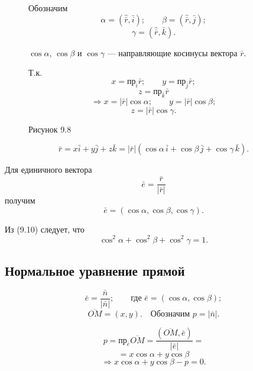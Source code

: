 \documentclass[12pt,a4paper]{article}
\newcommand{\vn}{\bar n}
\newcommand{\vr}{\bar r}
\newcommand{\ve}{\bar e}
\newcommand{\vi}{\bar i}
\newcommand{\vj}{\bar j}
\newcommand{\vk}{\bar k}
\begin{document}
\begin{figure}[H]
  \centering
  \begin{minipage}{0.4\textwidth}
    \centering
    \caption*{Рисунок 9.8}
  \end{minipage}%
  \begin{minipage}{0.55\textwidth}
    Обозначим
    $$
    \alpha=(\hat{\vr},\vi);\qquad
    \beta=(\hat{\vr},\vj);
    $$
    $$
    \gamma=(\hat{\vr},\vk).
    $$

    $\cos\alpha$, $\cos\beta$ и $\cos\gamma$ --- направляющие
    косинусы вектора $\vr$.

    Т.к.
    $$
    x=\text{пр}_{\vi}\vr;\qquad
    y=\text{пр}_{\vj}\vr;
    $$
    $$
    z=\text{пр}_{\vk}\vr
    $$
    $$
    \Rightarrow x=|\vr|\cos\alpha;\qquad
    y=|\vr|\cos\beta;
    $$
    $$
    z=|\vr|\cos\gamma.
    $$
  \end{minipage}
\end{figure}

$$
\vr=x\vi+y\vj+z\vk
=
|\vr|(\cos\alpha\,\vi+\cos\beta\,\vj+\cos\gamma\,\vk).
$$

Для единичного вектора
$$
\ve=\frac{\vr}{|\vr|}
$$
получим
\begin{equation}
  \ve=(\cos\alpha,\cos\beta,\cos\gamma). \tag{9.10}
\end{equation}

Из (9.10) следует, что
$$
\cos^2\alpha+\cos^2\beta+\cos^2\gamma=1.
$$

\subsection*{\textbf{Нормальное уравнение прямой}}

$$
\ve=\frac{\vn}{|\vn|};
\qquad
\text{где }\ve=(\cos\alpha,\cos\beta);
$$
$$
\overline{OM}=(x,y).
\quad
\text{Обозначим }p=|\vn|.
$$

$$
p=\text{пр}_{\ve}\overline{OM}
=
\frac{(\overline{OM},\ve)}{|\ve|}
=
$$
$$
=x\cos\alpha+y\cos\beta
$$
\begin{equation}
  \Rightarrow x\cos\alpha+y\cos\beta-p=0. \tag{9.11}
\end{equation}
\end{document}
